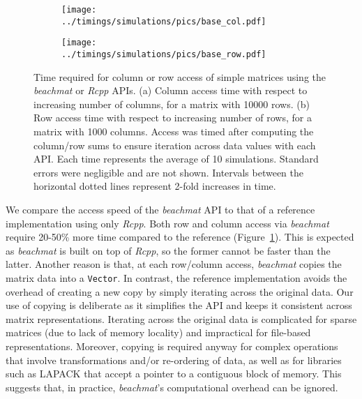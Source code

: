 \documentclass[10pt,letterpaper]{article}
\newcommand{\beachmat}{\textit{beachmat}}
\newcommand{\code}[1]{\texttt{#1}}
\begin{document}
\begin{figure}[bt]
    \centering
    \begin{subfigure}[b]{0.49\textwidth}
        \texttt{[image: ../timings/simulations/pics/base\_col.pdf]}
        \caption{}
    \end{subfigure}
    \begin{subfigure}[b]{0.49\textwidth}
        \texttt{[image: ../timings/simulations/pics/base\_row.pdf]}
        \caption{}
    \end{subfigure}
    \caption{Time required for column or row access of simple matrices using the \beachmat{} or \textit{Rcpp} APIs.
        (a) Column access time with respect to increasing number of columns, for a matrix with 10000 rows.
        (b) Row access time with respect to increasing number of rows, for a matrix with 1000 columns.
        Access was timed after computing the column/row sums to ensure iteration across data values with each API.
        Each time represents the average of 10 simulations.
        Standard errors were negligible and are not shown.
        Intervals between the horizontal dotted lines represent 2-fold increases in time.
    }
    \label{fig:basetime}
\end{figure}

We compare the access speed of the \beachmat{} API to that of a reference implementation using only \textit{Rcpp}.
Both row and column access via \beachmat{} require 20-50\% more time compared to the reference (Figure~\ref{fig:basetime}).
This is expected as \beachmat{} is built on top of \textit{Rcpp}, so the former cannot be faster than the latter.
Another reason is that, at each row/column access, \beachmat{} copies the matrix data into a \code{Vector}.
In contrast, the reference implementation avoids the overhead of creating a new copy by simply iterating across the original data.
Our use of copying is deliberate as it simplifies the API and keeps it consistent across matrix representations. 
Iterating across the original data is complicated for sparse matrices (due to lack of memory locality) and impractical for file-based representations.
Moreover, copying is required anyway for complex operations that involve transformations and/or re-ordering of data, as well as for libraries such as LAPACK that accept a pointer to a contiguous block of memory.
This suggests that, in practice, \beachmat{}'s computational overhead can be ignored.
\end{document}
